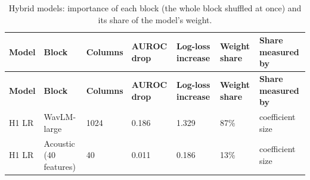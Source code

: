 \documentclass[11pt,a4paper]{article}
\begin{document}
\begin{center}\small\renewcommand{\arraystretch}{1.15}
\begin{longtable}{>{\raggedright\arraybackslash}p{1.86cm}>{\raggedright\arraybackslash}p{3.34cm}>{\raggedleft\arraybackslash}p{1.55cm}>{\raggedleft\arraybackslash}p{1.55cm}>{\raggedleft\arraybackslash}p{1.55cm}>{\raggedleft\arraybackslash}p{1.55cm}>{\raggedright\arraybackslash}p{2.16cm}}
\caption{Hybrid models: importance of each block (the whole block shuffled at once) and its share of the model's weight.}\\
\toprule
\textbf{\hspace{0pt}Model} & \textbf{\hspace{0pt}Block} & \textbf{\hspace{0pt}Columns} & \textbf{\hspace{0pt}AUROC drop} & \textbf{\hspace{0pt}Log-loss increase} & \textbf{\hspace{0pt}Weight share} & \textbf{\hspace{0pt}Share measured by}\\\midrule\endfirsthead
\toprule
\textbf{\hspace{0pt}Model} & \textbf{\hspace{0pt}Block} & \textbf{\hspace{0pt}Columns} & \textbf{\hspace{0pt}AUROC drop} & \textbf{\hspace{0pt}Log-loss increase} & \textbf{\hspace{0pt}Weight share} & \textbf{\hspace{0pt}Share measured by}\\\midrule\endhead
\bottomrule\endfoot
\hspace{0pt}H1 LR & \hspace{0pt}WavLM-large & \hspace{0pt}1024 & \hspace{0pt}0.186 & \hspace{0pt}1.329 & \hspace{0pt}87\% & \hspace{0pt}coefficient size\\
\hspace{0pt}H1 LR & \hspace{0pt}Acoustic (40 features) & \hspace{0pt}40 & \hspace{0pt}0.011 & \hspace{0pt}0.186 & \hspace{0pt}13\% & \hspace{0pt}coefficient size\\

\end{longtable}
\end{center}
\end{document}
